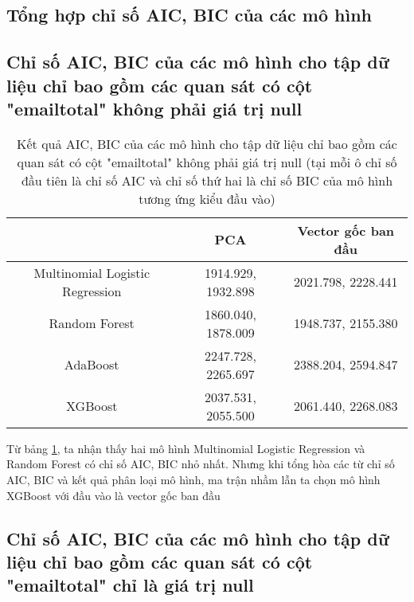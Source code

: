 \subsection{Tổng hợp chỉ số AIC, BIC của các mô hình}

\subsection{Chỉ số AIC, BIC của các mô hình cho tập dữ liệu chỉ bao gồm các quan sát có cột "emailtotal" không phải giá trị null}

\begin{table}[h!]
    \centering
    \begin{tabular}{|c|c|c|}
        \hline
        & PCA & Vector gốc ban đầu \\
        \hline
        Multinomial Logistic Regression & 1914.929, 1932.898 & 2021.798, 2228.441 \\
        \hline
        Random Forest & 1860.040, 1878.009 & 1948.737, 2155.380 \\
        \hline
        AdaBoost & 2247.728, 2265.697 & 2388.204, 2594.847 \\
        \hline
        XGBoost & 2037.531, 2055.500 & 2061.440, 2268.083 \\
        \hline
    \end{tabular}
    \caption{Kết quả AIC, BIC của các mô hình cho tập dữ liệu chỉ bao gồm các quan sát có cột "emailtotal" không phải giá trị null (tại mỗi ô chỉ số đầu tiên là chỉ số AIC và chỉ số thứ hai là chỉ số BIC của mô hình tương ứng kiểu đầu vào)}
    \label{tab:Non_null_AIC_BIC_Models}
\end{table}

Từ bảng \ref{tab:Non_null_AIC_BIC_Models}, ta nhận thấy hai mô hình Multinomial Logistic Regression và Random Forest có chỉ số AIC, BIC nhỏ nhất.
Nhưng khi tổng hòa các từ chỉ số AIC, BIC và kết quả phân loại mô hình, ma trận nhầm lẫn ta chọn mô hình XGBoost với đầu vào là vector gốc ban đầu


\subsection{Chỉ số AIC, BIC của các mô hình cho tập dữ liệu chỉ bao gồm các quan sát có cột "emailtotal" chỉ là giá trị null}

